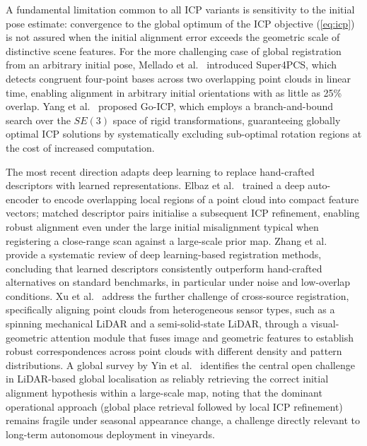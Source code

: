 A fundamental limitation common to all ICP variants is sensitivity to the initial pose estimate: convergence to the global optimum of the ICP objective (\cref{eq:icp}) is not assured when the initial alignment error exceeds the geometric scale of distinctive scene features. For the more challenging case of global registration from an arbitrary initial pose, Mellado et al.~\cite{melladoSuper4PCSFastGlobal2014} introduced Super4PCS, which detects congruent four-point bases across two overlapping point clouds in linear time, enabling alignment in arbitrary initial orientations with as little as 25\% overlap. Yang et al.~\cite{yangGoICPGloballyOptimal2016} proposed Go-ICP, which employs a branch-and-bound search over the $SE(3)$ space of rigid transformations, guaranteeing globally optimal ICP solutions by systematically excluding sub-optimal rotation regions at the cost of increased computation.

The most recent direction adapts deep learning to replace hand-crafted descriptors with learned representations. Elbaz et al.~\cite{elbaz3DPointCloudRegistration2017} trained a deep auto-encoder to encode overlapping local regions of a point cloud into compact feature vectors; matched descriptor pairs initialise a subsequent ICP refinement, enabling robust alignment even under the large initial misalignment typical when registering a close-range scan against a large-scale prior map. Zhang et al.~\cite{zhangDeepLearningBased2020} provide a systematic review of deep learning-based registration methods, concluding that learned descriptors consistently outperform hand-crafted alternatives on standard benchmarks, in particular under noise and low-overlap conditions. Xu et al.~\cite{xuCross3DRegLargescaleRealworld2025} address the further challenge of cross-source registration, specifically aligning point clouds from heterogeneous sensor types, such as a spinning mechanical LiDAR and a semi-solid-state LiDAR, through a visual-geometric attention module that fuses image and geometric features to establish robust correspondences across point clouds with different density and pattern distributions. A global survey by Yin et al.~\cite{yinSurveyGlobalLiDAR2024} identifies the central open challenge in LiDAR-based global localisation as reliably retrieving the correct initial alignment hypothesis within a large-scale map, noting that the dominant operational approach (global place retrieval followed by local ICP refinement) remains fragile under seasonal appearance change, a challenge directly relevant to long-term autonomous deployment in vineyards.